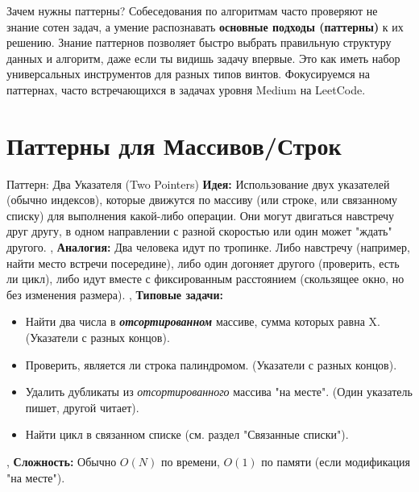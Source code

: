 
\begin{myblock}{Зачем нужны паттерны?}
    Собеседования по алгоритмам часто проверяют не знание сотен задач, а умение распознавать \textbf{основные подходы (паттерны)} к их решению. Знание паттернов позволяет быстро выбрать правильную структуру данных и алгоритм, даже если ты видишь задачу впервые. Это как иметь набор универсальных инструментов для разных типов винтов. Фокусируемся на паттернах, часто встречающихся в задачах уровня Medium на LeetCode.
\end{myblock}

\section{Паттерны для Массивов/Строк}

\begin{textbox}{Паттерн: Два Указателя (Two Pointers)}
    \textbf{Идея:} Использование двух указателей (обычно индексов), которые движутся по массиву (или строке, или связанному списку) для выполнения какой-либо операции. Они могут двигаться навстречу друг другу, в одном направлении с разной скоростью или один может "ждать" другого. \sep
    \textbf{Аналогия:} Два человека идут по тропинке. Либо навстречу (например, найти место встречи посередине), либо один догоняет другого (проверить, есть ли цикл), либо идут вместе с фиксированным расстоянием (скользящее окно, но без изменения размера). \sep
    \textbf{Типовые задачи:}
    \begin{itemize}[nosep, leftmargin=*]
        \item Найти два числа в \textit{\textbf{отсортированном}} массиве, сумма которых равна X. (Указатели с разных концов).
        \item Проверить, является ли строка палиндромом. (Указатели с разных концов).
        \item Удалить дубликаты из \textit{отсортированного} массива "на месте". (Один указатель пишет, другой читает).
        \item Найти цикл в связанном списке (см. раздел "Связанные списки").
    \end{itemize} \sep
    \textbf{Сложность:} Обычно \textbf{$O(N)$} по времени, \textbf{$O(1)$} по памяти (если модификация "на месте").
\end{textbox}

